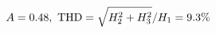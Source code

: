 \documentclass[preview]{standalone}
\begin{document}
\begin{align*}
\special{dvisvgm:raw <g id='unique000'>}A=0.48,\ \text{THD}=\sqrt{H_2^2+H_3^2}/H_1=9.3\%\special{dvisvgm:raw </g>}
\end{align*}
\end{document}

